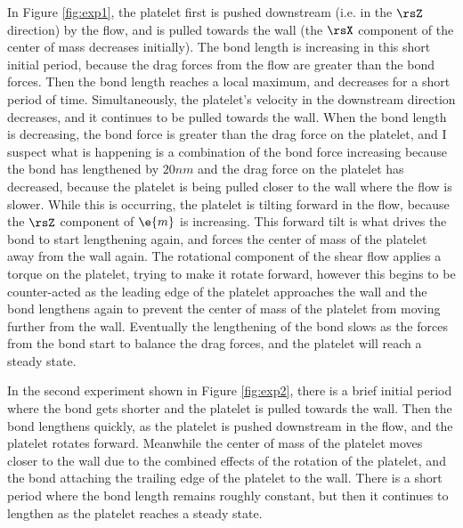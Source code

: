 In Figure \ref{fig:exp1}, the platelet first is pushed downstream
(i.e. in the $\rsZ$ direction) by the flow, and is pulled towards the
wall (the $\rsX$ component of the center of mass decreases
initially). The bond length is increasing in this short initial
period, because the drag forces from the flow are greater than the
bond forces. Then the bond length reaches a local maximum, and
decreases for a short period of time. Simultaneously, the platelet's
velocity in the downstream direction decreases, and it continues to be
pulled towards the wall. When the bond length is decreasing, the bond
force is greater than the drag force on the platelet, and I suspect
what is happening is a combination of the bond force increasing
because the bond has lengthened by $20 nm$ and the drag force on the
platelet has decreased, because the platelet is being pulled closer to
the wall where the flow is slower. While this is occurring, the
platelet is tilting forward in the flow, because the $\rsZ$ component
of $\e{m}$ is increasing. This forward tilt is what drives the bond to
start lengthening again, and forces the center of mass of the platelet
away from the wall again. The rotational component of the shear flow
applies a torque on the platelet, trying to make it rotate forward,
however this begins to be counter-acted as the leading edge of the
platelet approaches the wall and the bond lengthens again to prevent
the center of mass of the platelet from moving further from the
wall. Eventually the lengthening of the bond slows as the forces from
the bond start to balance the drag forces, and the platelet will reach
a steady state.

In the second experiment shown in Figure \ref{fig:exp2}, there is a
brief initial period where the bond gets shorter and the platelet is
pulled towards the wall. Then the bond lengthens quickly, as the
platelet is pushed downstream in the flow, and the platelet rotates
forward. Meanwhile the center of mass of the platelet moves closer to
the wall due to the combined effects of the rotation of the platelet,
and the bond attaching the trailing edge of the platelet to the
wall. There is a short period where the bond length remains roughly
constant, but then it continues to lengthen as the platelet reaches a
steady state.

